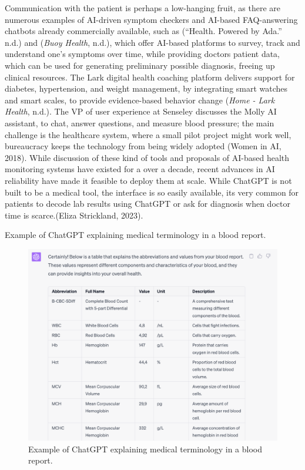 \documentclass[
  12pt,
  letterpaper,
  DIV=11,
  numbers=noendperiod]{scrartcl}
\begin{document}
Communication with the patient is perhaps a low-hanging fruit, as there
are numerous examples of AI-driven symptom checkers and AI-based
FAQ-answering chatbots already commercially available, such as
({``Health. {Powered} by {Ada}.''} n.d.) and (\emph{Buoy {Health}},
n.d.), which offer AI-based platforms to survey, track and understand
one's symptoms over time, while providing doctors patient data, which
can be used for generating preliminary possible diagnosis, freeing up
clinical resources. The Lark digital health coaching platform delivers
support for diabetes, hypertension, and weight management, by
integrating smart watches and smart scales, to provide evidence-based
behavior change (\emph{Home - {Lark Health}}, n.d.). The VP of user
experience at Senseley discusses the Molly AI assistant, to chat, answer
questions, and measure blood pressure; the main challenge is the
healthcare system, where a small pilot project might work well,
bureaucracy keeps the technology from being widely adopted (Women in AI,
2018). While discussion of these kind of tools and proposals of AI-based
health monitoring systems have existed for a over a decade, recent
advances in AI reliability have made it feasible to deploy them at
scale. While ChatGPT is not built to be a medical tool, the interface is
so easily available, its very common for patients to decode lab results
using ChatGPT or ask for diagnosis when doctor time is scarce.(Eliza
Strickland, 2023).

Example of ChatGPT explaining medical terminology in a blood report.

\begin{figure}[H]

{\centering \includegraphics[width=1\linewidth,height=\textheight,keepaspectratio]{./images/ai/chatgpt-medical.png}

}

\caption{Example of ChatGPT explaining medical terminology in a blood
report.}

\end{figure}%
\end{document}
